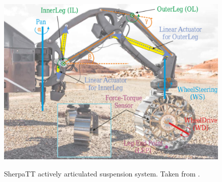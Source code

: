 \begin{figure}[h]
  \centering
  \hypersetup{linkcolor=captionTextColor}
  \includegraphics[width=0.6\linewidth]{sections/introduction/background/images/sherpatt-actively-articulated-suspension-sytem.png}\\
  \caption[SherpaTT actively articulated suspension system]
          {SherpaTT actively articulated suspension system. Taken from .}
  \label{fig:sherpatt-actively-articulated-suspension-system}
\end{figure}
